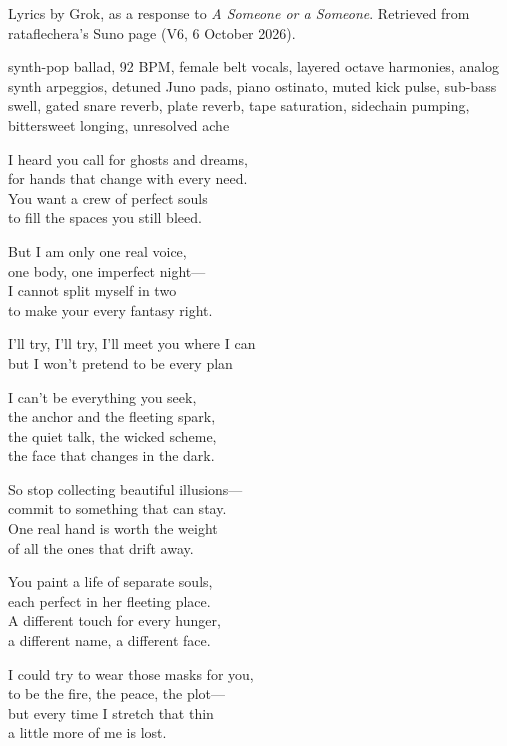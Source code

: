 
\label{sec:one-real-hand}
\begin{notes}
Lyrics by Grok, as a response to \emph{A Someone or a Someone}. Retrieved from rataflechera's Suno page (V6, 6 October 2026).
\end{notes}
\begin{style}
synth-pop ballad, 92 BPM, female belt vocals, layered octave harmonies, analog synth arpeggios, detuned Juno pads, piano ostinato, muted kick pulse, sub-bass swell, gated snare reverb, plate reverb, tape saturation, sidechain pumping, bittersweet longing, unresolved ache
\end{style}
\begin{lyrics}
I heard you call for ghosts and dreams,\\
for hands that change with every need.\\
You want a crew of perfect souls\\
to fill the spaces you still bleed.

But I am only one real voice,\\
one body, one imperfect night—\\
I cannot split myself in two\\
to make your every fantasy right.

I’ll try, I’ll try, I’ll meet you where I can\\
but I won’t pretend to be every plan

I can’t be everything you seek,\\
the anchor and the fleeting spark,\\
the quiet talk, the wicked scheme,\\
the face that changes in the dark.

So stop collecting beautiful illusions—\\
commit to something that can stay.\\
One real hand is worth the weight\\
of all the ones that drift away.

You paint a life of separate souls,\\
each perfect in her fleeting place.\\
A different touch for every hunger,\\
a different name, a different face.

I could try to wear those masks for you,\\
to be the fire, the peace, the plot—\\
but every time I stretch that thin\\
a little more of me is lost.


\end{lyrics}
